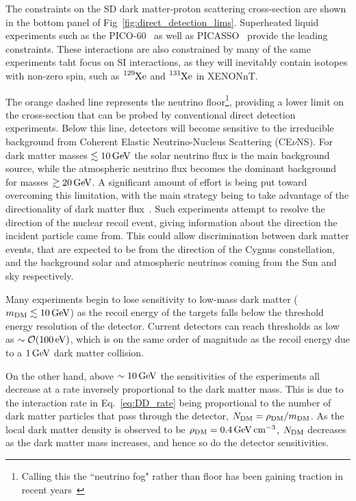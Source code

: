 The constraints on the SD dark matter-proton scattering cross-section are shown in the bottom panel of Fig~\ref{fig:direct_detection_lims}. 
Superheated liquid experiments such as the PICO-60~\cite{PICO:2019vsc_jul_Darkmattersearch} as well as PICASSO~\cite*{Behnke:2016lsk_apr_FinalResultsPICASSO} provide the leading constraints. 
These interactions are also constrained by many of the same experiments taht focus on SI interactions, as they will inevitably contain isotopes with non-zero spin, such as $\ce{^{129} Xe}$ and $\ce{^{131} Xe}$ in XENONnT. 

The orange dashed line represents the neutrino floor\footnote{Calling this the ``neutrino fog" rather than floor has been gaining traction in recent years~\cite{OHare:2021utq_dec_Foghorizonnew}}, providing a lower limit on the cross-section that can be probed by conventional direct detection experiments. Below this line, detectors will become sensitive to the irreducible background from Coherent Elastic Neutrino-Nucleus Scattering (CE$\nu$NS). For dark matter masses $\lesssim 10{\rm \,GeV}$ the solar neutrino flux is the main background source, while the atmospheric neutrino flux becomes the dominant background for masses $\gtrsim 20{\rm \,GeV}$. 
A significant amount of effort is being put toward overcoming this limitation, with the main strategy being to take advantage of the directionality of dark matter flux~\cite{Grothaus:2014hja_jun_DirectionalDarkMatter}. Such experiments attempt to resolve the direction of the nuclear recoil event, giving information about the direction the incident particle came from. This could allow discrimination between dark matter events, that are expected to be from the direction of the Cygnus constellation, and the background solar and atmospheric neutrinos coming from the Sun and sky respectively. 

Many experiments begin to lose sensitivity to low-mass dark matter ($m_\mathrm{DM}\lesssim 10{\rm \,GeV}$) as the recoil energy of the targets falls below the threshold energy resolution of the detector. Current detectors can reach thresholds as low as $\sim {\cal O} (100{\rm \,eV})$, which is on the same order of magnitude as the recoil energy due to a $1{\rm \,GeV}$ dark matter collision. 

On the other hand, above $\sim 10{\rm \,GeV}$ the sensitivities of the experiments all decrease at a rate inversely proportional to the dark matter mass.  This is due to the interaction rate in Eq.~\ref{eq:DD_rate} being proportional to the number of dark matter particles that pass through the detector, $N_\mathrm{DM} = \rho_\mathrm{DM}/m_\mathrm{DM}$. As the local dark matter density is observed to be $\rho_\mathrm{DM} = 0.4{\rm \,GeV} {\rm \,cm}^{-3}$, $N_\mathrm{DM}$ decreases as the dark matter mass increases, and hence so do the detector sensitivities. 

